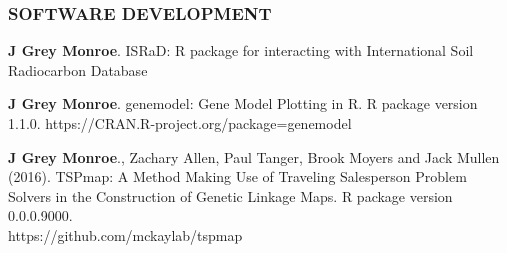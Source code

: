 \documentclass[12pt,english]{article}
\begin{document}
\vspace{0.5em}\par



\subsubsection*{SOFTWARE DEVELOPMENT}
\vspace{-0.5ex}

\begin{hangparas}{.5in}{1}
\hspace{1em}\textbf{J Grey Monroe}. ISRaD: R package for interacting with International Soil Radiocarbon Database\vspace{0.5ex}\par
\hspace{1em}\textbf{J Grey Monroe}. genemodel: Gene Model Plotting in R. R package version 1.1.0.
  https://CRAN.R-project.org/package=genemodel
\vspace{0.5ex}\par
\hspace{1em}\textbf{J Grey Monroe}., Zachary Allen, Paul Tanger, Brook Moyers and Jack Mullen (2016). TSPmap: A Method Making Use of Traveling Salesperson Problem Solvers in the Construction of Genetic Linkage Maps. R package version 0.0.0.9000. \\https://github.com/mckaylab/tspmap

\end{hangparas}
\end{document}
